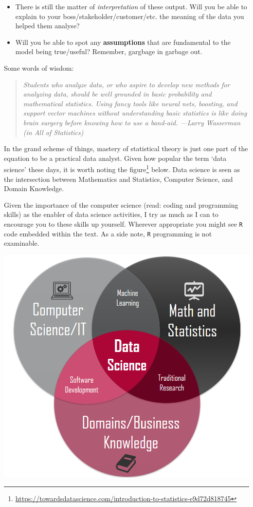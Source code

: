 \documentclass[
]{book}
\theoremstyle{definition}
\theoremstyle{definition}
\theoremstyle{definition}
\theoremstyle{definition}
\theoremstyle{remark}
\begin{document}
\begin{itemize}
\item
  There is still the matter of \emph{interpretation} of these output. Will you be able to explain to your boss/stakeholder/customer/etc. the meaning of the data you helped them analyse?
\item
  Will you be able to spot any \textbf{assumptions} that are fundamental to the model being true/useful? Remember, gargbage in garbage out.
\end{itemize}

Some words of wisdom:

\begin{quote}
\emph{Students who analyze data, or who aspire to develop new methods for analyzing data, should be well grounded in basic probability and mathematical statistics. Using fancy tools like neural nets, boosting, and support vector machines without understanding basic statistics is like doing brain surgery before knowing how to use a band-aid. ---Larry Wasserman (in All of Statistics)}
\end{quote}

In the grand scheme of things, mastery of statistical theory is just one part of the equation to be a practical data analyst. Given how popular the term `data science' these days, it is worth noting the figure\footnote{\url{https://towardsdatascience.com/introduction-to-statistics-e9d72d818745}} below. Data science is seen as the intersection between Mathematics and Statistics, Computer Science, and Domain Knowledge.

Given the importance of the computer science (read: coding and programming skills) as the enabler of data science activities, I try as much as I can to encourage you to these skills up yourself. Wherever appropriate you might see \texttt{R} code embedded within the text. As a side note, \texttt{R} programming is not examinable.

\begin{center}\includegraphics[width=0.6\linewidth]{figure/00-ds2} \end{center}
\end{document}
